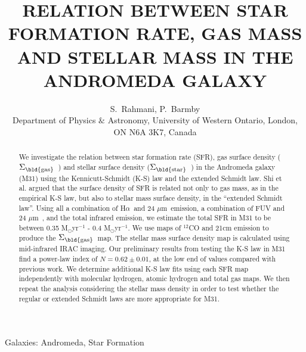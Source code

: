 \documentclass[useAMS,usenatbib]{mn2e}
\newcommand \sigmagas    {$\Sigma_{\rm \bld {gas }}$\ }
\newcommand \sigmastar    {$\Sigma_{\rm \bld {star }}$\ }
\newcommand \halpha    {H$\alpha $\ }
\newcommand \um    {$\mu$m\ }
\begin{document}
\title[WHICH STAR FORMATION LAW IN M31]{RELATION BETWEEN STAR FORMATION RATE, GAS MASS AND STELLAR MASS IN THE ANDROMEDA GALAXY}
\author[S. Rahmani $\&$ P. Barmby]{S.~Rahmani, P.~Barmby\\
Department of Physics $\&$ Astronomy, University of Western Ontario, London, ON N6A 3K7, Canada}
\maketitle

\begin{abstract} %
 We investigate the relation between star formation rate (SFR), gas surface density (\sigmagas) and stellar surface density (\sigmastar) in the Andromeda galaxy (M31) using the Kennicutt-Schmidt (K-S) law and the extended Schmidt law. Shi et al. argued that the surface density of SFR is related not only to gas mass, as in the empirical K-S law,  but also to stellar mass surface density, in the ``extended Schmidt law''. Using all a combination of \halpha and 24 \um emission, a combination of FUV and 24 \um, and the total infrared emission, we estimate the total SFR in M31 to be between 0.35 M$_{\odot}$yr$^{-1}$ - 0.4 M$_{\odot}$yr$^{-1}$. We use maps of $^{12}$CO and 21cm emission to produce the \sigmagas map.%
 The stellar mass surface density  map is calculated using mid-infrared IRAC imaging. Our preliminary results from testing the K-S law in M31 find a power-law index of  $N = 0.62 \pm 0.01$, at the low end of values compared with previous work. We determine additional K-S law fits using each SFR map independently with molecular hydrogen, atomic hydrogen and total gas maps. We then repeat the analysis considering the stellar mass density in order to test whether the regular or extended Schmidt laws are more appropriate for M31.

\end{abstract}
\begin{keywords}
Galaxies: Andromeda, Star Formation
\end{keywords}
\end{document}
